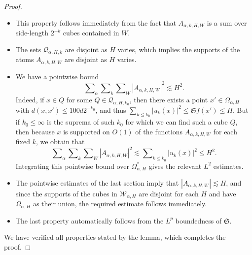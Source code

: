 \begin{proof}
\begin{itemize}
        \item This property follows immediately from the fact that $A_{\alpha,k,H,W}$ is a sum over side-length $2^{-k}$ cubes contained in $W$.

        \item The sets $\mathcal{Q}_{\alpha,H,k}$ are disjoint as $H$ varies, which implies the supports of the atoms $A_{\alpha,k,H,W}$ are disjoint as $H$ varies.

        \item We have a pointwise bound
    \begin{equation}
        \sum\nolimits_\alpha \sum\nolimits_k \sum\nolimits_W |A_{\alpha,k,H,W}|^2 \lesssim H^2.
    \end{equation}
    Indeed, if $x \in Q$ for some $Q \in \mathcal{Q}_{\alpha,H,k_0}$, then there exists a point $x' \in \Omega_{\alpha,H}$ with $d(x,x') \leq 100 d 2^{-k_0}$, and thus $\sum\nolimits_{k \leq k_0} |u_k(x)|^2 \leq \mathfrak{S} f(x') \leq H$. But if $k_0 \leq \infty$ is the suprema of such $k_0$ for which we can find such a cube $Q$, then because $x$ is supported on $O(1)$ of the functions $A_{\alpha,k,H,W}$ for each fixed $k$, we obtain that
    \begin{equation}
        \sum\nolimits_\alpha \sum\nolimits_k \sum\nolimits_W |A_{\alpha,k,H,W}|^2 \lesssim \sum\nolimits_{k \leq k_0} |u_k(x)|^2 \leq H^2.
    \end{equation}
    Integrating this pointwise bound over $\Omega_{\alpha,H}^*$ gives the relevant $L^2$ estimates.

    \item The pointwise estimates of the last section imply that $|A_{\alpha,k,H,W}| \lesssim H$, and since the supports of the cubes in $\mathcal{W}_{\alpha,H}$ are disjoint for each $H$ and have $\Omega_{\alpha,H}$ as their union, the required estimate follows immediately.

    \item The last property automatically follows from the $L^p$ boundedness of $\mathfrak{S}$.
    \end{itemize}
    We have verified all properties stated by the lemma, which completes the proof.
\end{proof}

